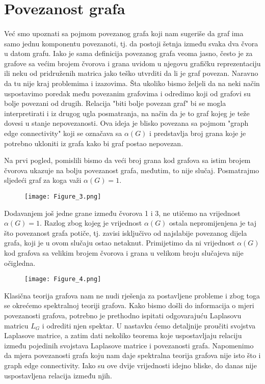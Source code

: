 \documentclass[11pt]{article}
\begin{document}
	\section{Povezanost grafa}
	\paragraph{}
	Već smo upoznati sa pojmom povezanog grafa koji nam sugeriše da graf ima samo jednu komponentu povezanoti, tj. da postoji šetnja između svaka dva čvora u datom grafu.
	Iako je sama definicija povezanog grafa veoma jasno, često je za grafove sa većim brojem čvorova i grana uvidom u njegovu grafičku reprezentaciju ili neku od pridruženih matrica jako teško utvrditi
	da li je graf povezan. Naravno da tu nije kraj problemima i izazovima. Šta ukoliko bismo željeli da na neki način uspostavimo poredak među povezanim grafovima i odredimo koji od grafovi su bolje povezani od drugih.
	Relacija "biti bolje povezan graf" bi se mogla interpretirati i iz drugog ugla posmatranja, na način da je to graf kojeg je teže dovesi u stanje nepovezanosti.
	Ova ideja je blisko povezana sa pojmom "graph edge connectivity" koji se označava sa $\alpha(G)$ i predstavlja broj grana koje je potrebno ukloniti iz grafa kako bi graf postao nepovezan.
	
	Na prvi pogled, pomislili bismo da veći broj grana kod grafova sa istim brojem čvorova ukazuje na bolju povezanost grafa, međutim, to nije slučaj.
	Posmatrajmo sljedeći graf za koga važi $\alpha(G)=1$.

	\begin{figure}[h]
		\centering
		\texttt{[image: Figure\_3.png]}
	\end{figure}
	
	Dodavanjem još jedne grane između čvorova 1 i 3, ne utičemo na vrijednost $\alpha(G)=1$. Razlog zbog kojeg je vrijednost $\alpha(G)$ ostala nepromijenjena je taj što povezanost grafa potiče, tj. zavisi isključivo od najslabije povezanog dijela grafa, koji je u ovom slučaju ostao netaknut.
	Primijetimo da ni vrijednost $\alpha(G)$ kod grafova sa velikim brojem čvorova i grana u velikom broju slučajeva nije očigledna.
	
	\begin{figure}[h]
		\centering
		\texttt{[image: Figure\_4.png]}
	\end{figure}

	Klasična teorija grafova nam ne nudi rješenja za postavljene probleme i zbog toga se okrećemo spektralnoj teoriji grafova. 
	Kako bismo došli do informacija o mjeri povezanosti grafova, potrebno je prethodno ispitati odgovarajuću Laplasovu matricu $L_G$ i odrediti njen spektar.
	U nastavku ćemo detaljnije proučiti svojstva Laplasove matrice, a zatim dati nekoliko teorema koje uspostavljaju relaciju između pojedinih svojstava Laplasove matrice i povezanosti grafa.
	Napomenimo da mjera povezanosti grafa koju nam daje spektralna teorija grafova nije isto što i graph edge connectivity. Iako su ove dvije vrijednosti idejno bliske, do danas nije uspostavljena relacija između njih.
	
\end{document}
